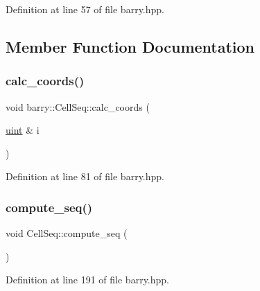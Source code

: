 Definition at line 57 of file barry.\+hpp.



\subsection{Member Function Documentation}
\mbox{\label{classbarry_1_1_cell_seq_aa3814680024ba20695c8846c4dae7036}} 
\subsubsection{\texorpdfstring{calc\+\_\+coords()}{calc\_coords()}}
{\footnotesize\ttfamily void barry\+::\+Cell\+Seq\+::calc\+\_\+coords (\begin{DoxyParamCaption}\item[{\hyperlink{namespacebarry_a11dfc53ddb4672278319aa04f1e09a6c}{uint} \&}]{i }\end{DoxyParamCaption})\hspace{0.3cm}{\ttfamily [inline]}}



Definition at line 81 of file barry.\+hpp.

\mbox{\label{classbarry_1_1_cell_seq_a6588fe1ad4e37f7a845386eca46c13c2}} 
\subsubsection{\texorpdfstring{compute\+\_\+seq()}{compute\_seq()}}
{\footnotesize\ttfamily void Cell\+Seq\+::compute\+\_\+seq (\begin{DoxyParamCaption}{ }\end{DoxyParamCaption})\hspace{0.3cm}{\ttfamily [inline]}}



Definition at line 191 of file barry.\+hpp.

\mbox{\label{classbarry_1_1_cell_seq_a12235ff9c4a0183ed477679b61c4a19a}} 

